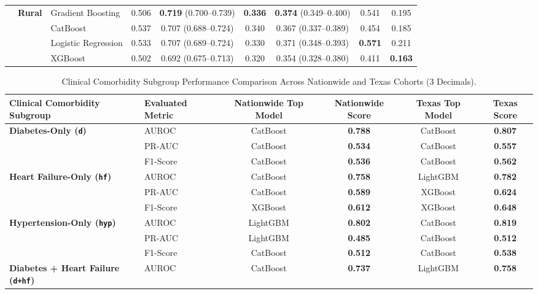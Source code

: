 \documentclass[10pt,journal]{IEEEtran}
\begin{document}
\begin{table}[!t]
\begin{tabular}{lllcccccc}
\cmidrule{2-9}
 & \textbf{Rural} & Gradient Boosting & 0.506 & \textbf{0.719} (0.700--0.739) & \textbf{0.336} & \textbf{0.374} (0.349--0.400) & 0.541 & 0.195 \\
 & & CatBoost & 0.537 & 0.707 (0.688--0.724) & 0.340 & 0.367 (0.337--0.389) & 0.454 & 0.185 \\
 & & Logistic Regression & 0.533 & 0.707 (0.689--0.724) & 0.330 & 0.371 (0.348--0.393) & \textbf{0.571} & 0.211 \\
 & & XGBoost & 0.502 & 0.692 (0.675--0.713) & 0.320 & 0.354 (0.328--0.380) & 0.411 & \textbf{0.163} \\
\bottomrule
\end{tabular}
\end{table}

\begin{table}[!t]
\caption{Clinical Comorbidity Subgroup Performance Comparison Across Nationwide and Texas Cohorts (3 Decimals).}
\label{tab:s_clinical_subgroups}
\centering
\footnotesize
\begin{tabular}{llcccc}
\toprule
\textbf{Clinical Comorbidity Subgroup} & \textbf{Evaluated Metric} & \textbf{Nationwide Top Model} & \textbf{Nationwide Score} & \textbf{Texas Top Model} & \textbf{Texas Score} \\
\midrule
\textbf{Diabetes-Only (\texttt{d})} & AUROC & CatBoost & \textbf{0.788} & CatBoost & \textbf{0.807} \\
 & PR-AUC & CatBoost & \textbf{0.534} & CatBoost & \textbf{0.557} \\
 & F1-Score & CatBoost & \textbf{0.536} & CatBoost & \textbf{0.562} \\
\midrule
\textbf{Heart Failure-Only (\texttt{hf})} & AUROC & CatBoost & \textbf{0.758} & LightGBM & \textbf{0.782} \\
 & PR-AUC & CatBoost & \textbf{0.589} & XGBoost & \textbf{0.624} \\
 & F1-Score & XGBoost & \textbf{0.612} & XGBoost & \textbf{0.648} \\
\midrule
\textbf{Hypertension-Only (\texttt{hyp})} & AUROC & LightGBM & \textbf{0.802} & CatBoost & \textbf{0.819} \\
 & PR-AUC & LightGBM & \textbf{0.485} & CatBoost & \textbf{0.512} \\
 & F1-Score & CatBoost & \textbf{0.512} & CatBoost & \textbf{0.538} \\
\midrule
\textbf{Diabetes + Heart Failure (\texttt{d+hf})} & AUROC & CatBoost & \textbf{0.737} & LightGBM & \textbf{0.758} \\

\end{tabular}
\end{table}
\end{document}
